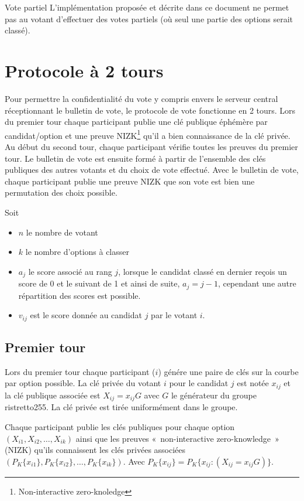 \documentclass[../report]{subfiles}
\begin{document}
\begin{nota}{Vote partiel}
	L'implémentation proposée et décrite dans ce document ne permet pas au votant d'effectuer des votes 
	partiels (où seul une partie des options serait classé).
\end{nota}


\section{Protocole à 2 tours}

Pour permettre la confidentialité du vote y compris envers le serveur central réceptionnant
le bulletin de vote, le protocole de vote fonctionne en 2 tours.
Lors du premier tour chaque participant publie une clé publique éphémère par candidat/option et une 
preuve NIZK\footnote{Non-interactive zero-knoledge} qu'il a bien connaissance de la clé privée.
Au début du second tour, chaque participant vérifie toutes les preuves du premier tour.
Le bulletin de vote est ensuite formé à partir de l'ensemble des clés publiques des autres 
votants et du choix de vote effectué.
Avec le bulletin de vote, chaque participant publie une preuve NIZK que son vote est bien 
une permutation des choix possible.

Soit 

\begin{itemize}
	\item $n$ le nombre de votant
	\item $k$ le nombre d'options à classer
	\item $a_j$ le score associé au rang $j$, lorsque le candidat classé en dernier reçois un score de 0 et le suivant de 1 et ainsi de suite, $a_j = j - 1$, cependant une autre répartition des scores est possible.
	\item $v_{ij}$ est le score donnée au candidat $j$ par le votant $i$.
\end{itemize}

\subsection{Premier tour}

Lors du premier tour chaque participant ($i$) génére une paire de clés sur la courbe par option possible.
La clé privée du votant $i$ pour le candidat $j$ est notée $x_{ij}$ et la clé publique associée 
est $X_{ij} = x_{ij} G$ avec $G$ le générateur du groupe ristretto255.
La clé privée est tirée uniformément dans le groupe.

Chaque participant publie les clés publiques pour chaque option $(X_{i1}, X_{i2}, \dots, X_{ik})$ ainsi que les preuves 
«~non-interactive zero-knowledge~» (NIZK) qu'ils connaissent les clés privées associées \\ $(P_K\{x_{i1}\}, P_K\{x_{i2}\}, \dots, P_K\{x_{ik}\})$. 
Avec $P_K\{x_{ij}\} = P_K\{x_{ij}: (X_{ij} = x_{ij} G)\}$.
\end{document}
